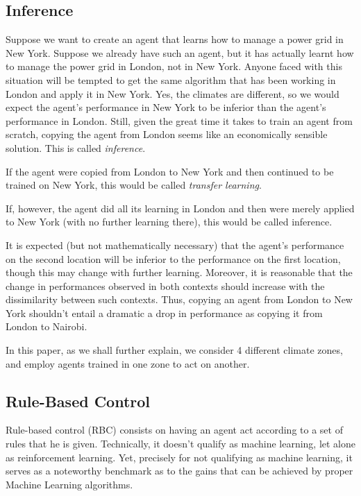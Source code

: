 \documentclass{article}
\begin{document}
\subsection{Inference}

Suppose we want to create an agent that learns how to manage a power grid in New York. Suppose we already have such an agent, but it has actually learnt how to manage the power grid in London, not in New York. Anyone faced with this situation will be tempted to get the same algorithm that has been working in London and apply it in New York. Yes, the climates are different, so we would expect the agent's performance in New York to be inferior than the agent's performance in London. Still, given the great time it takes to train an agent from scratch, copying the agent from London seems like an economically sensible solution. This is called \emph{inference}.

If the agent were copied from London to New York and then continued to be trained on New York, this would be called \emph{transfer learning}.

If, however, the agent did all its learning in London and then were merely applied to New York (with no further learning there), this would be called inference.

It is expected (but not mathematically necessary) that the agent's performance on the second location will be inferior to the performance on the first location, though this may change with further learning. Moreover, it is reasonable that the change in performances observed in both contexts should increase with the dissimilarity between such contexts. Thus, copying an agent from London to New York shouldn't entail a dramatic a drop in performance as copying it from London to Nairobi.

In this paper, as we shall further explain, we consider 4 different climate zones, and employ agents trained in one zone to act on another.

\subsection{Rule-Based Control}

Rule-based control (RBC) consists on having an agent act according to a set of rules that he is given. Technically, it doesn't qualify as machine learning, let alone as reinforcement learning. Yet, precisely for not qualifying as machine learning, it serves as a noteworthy benchmark as to the gains that can be achieved by proper Machine Learning algorithms.
\end{document}
